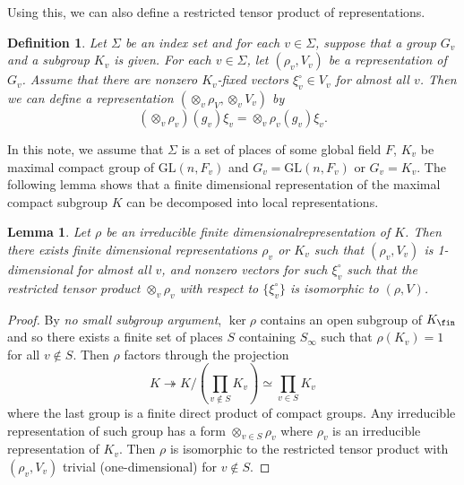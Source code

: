 \documentclass{article}
\newtheorem{lemma}{Lemma}[section]
\newtheorem{definition}{Definition}[section]
\newcommand{\GL}{\mathrm{GL}}
\begin{document}
Using this,  we can also define a restricted tensor product of representations. 

\begin{definition}
Let $\Sigma$ be an index set and for each $v\in \Sigma$, suppose that a group $G_{v}$ and a subgroup $K_{v}$ is given. 
For each $v\in \Sigma$, let $(\rho_{v}, V_{v})$ be a representation of $G_{v}$. 
Assume that there are nonzero $K_{v}$-fixed vectors $\xi_{v}^{\circ}\in V_{v}$ for almost all $v$.
Then we can define a representation $(\otimes_{v}\rho_{V}, \otimes_{v} V_{v})$ by 
$$
(\otimes_{v}\rho_{v})(g_{v})\xi_{v} = \otimes_{v}\rho_{v}(g_{v})\xi_{v}. 
$$
\end{definition}
In this note, we assume that $\Sigma$ is a set of places of some global field $F$, $K_{v}$ be maximal compact group of $\GL(n, F_{v})$ and $G_{v}= \GL(n, F_{v})$ or $G_{v} = K_{v}$. 
The following lemma shows that a finite dimensional representation of the maximal compact subgroup $K$ can be decomposed into local representations.
\begin{lemma}
\label{cptprod}
Let $\rho$ be an irreducible finite dimensionalrepresentation of $K$. Then there exists finite dimensional representations $\rho_{v}$ or $K_{v}$ such that $(\rho_{v}, V_{v})$ is 1-dimensional for almost all $v$, and nonzero vectors for such $\xi_{v}^{\circ}$ such that the restricted tensor product $\otimes_{v}\rho_{v}$ with respect to $\{\xi_{v}^{\circ}\}$ is isomorphic to $(\rho, V)$. 
\end{lemma}
\begin{proof}
By \emph{no small subgroup argument}, $\ker \rho$ contains an open subgroup of $K_{\fin}$ and so there exists a finite set of places $S$ containing $S_{\infty}$ such that $\rho(K_{v}) = 1$ for all $v\not\in S$. 
Then $\rho$ factors through the projection 
$$
K \twoheadrightarrow K / (\prod_{v\not\in S} K_{v}) \simeq \prod_{v\in S} K_{v}
$$
where the last group is a finite direct product of compact groups. 
Any irreducible representation of such group has a form $\otimes_{v\in S} \rho_{v}$ where $\rho_{v}$ is an irreducible representation of $K_{v}$. Then $\rho$ is isomorphic to the restricted tensor product with $(\rho_{v}, V_{v})$ trivial (one-dimensional) for $v\not\in S$.  
\end{proof}


\begin{comment}
\begin{definition}[Admissible representation of $\GL(n, \Aa)$]
A representation $(\pi, V)$ of $\GL(n, \Aa)$ is admissible if $V$ is both $(\frag_{\infty}, K_{\infty})$-module and $\GL(n, \Aa_{\fin})$-module with commuting actions, where every vector in $V$ is $K$-finite and $\rho$-isotypic part $V(\rho)$ of $V$ is finite dimensional for any irreducible finite dimensionalrepresentation of $K$. 
\end{definition}
Note that this is almost same as the local definitions that we defined in the previous chapters. 
\end{comment}
\end{document}
